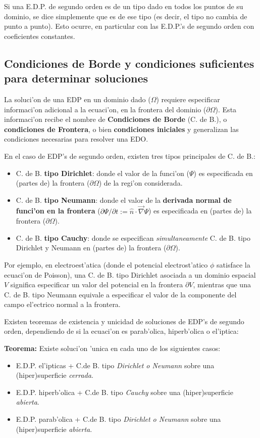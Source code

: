 Si una E.D.P. de segundo orden es de un tipo dado en todos los puntos de su dominio, se dice simplemente que es de ese tipo (es decir, el tipo no cambia de punto a punto). Esto ocurre, en particular con las E.D.P.'s de segundo orden con coeficientes constantes.

\subsection{Condiciones de Borde y condiciones suficientes para determinar soluciones}
La soluci'on de una EDP en un dominio dado ($\Omega$) requiere especificar informaci'on adicional a la ecuaci'on, en la frontera del dominio ($\partial\Omega$). Esta informaci'on recibe el nombre de \textbf{Condiciones de Borde} (C. de B.), o \textbf{condiciones de Frontera}, o bien \textbf{condiciones iniciales} y generalizan las condiciones necesarias para resolver una EDO.

En el caso de EDP's de segundo orden, existen tres tipos principales de C. de B.:

\begin{itemize}
\item C. de B. \textbf{tipo Dirichlet}: donde el valor de la funci'on ($\Psi$) es especificada en (partes de) la frontera ($\partial\Omega$) de la regi'on considerada.
\item C. de B. \textbf{tipo Neumann}: donde el valor de la \textbf{derivada normal de funci'on en la frontera} ($\partial\Psi/\partial t:=\hat{n}\cdot\vec\nabla\Psi$) es especificada en (partes de) la frontera ($\partial\Omega$).
\item C. de B. \textbf{tipo Cauchy}: donde se especifican \textit{simultaneamente} C. de B. tipo Dirichlet y Neumann en (partes de) la frontera ($\partial\Omega$).
\end{itemize}

Por ejemplo, en electroest'atica (donde el potencial electrost'atico $\phi$ satisface la ecuaci'on de Poisson), una C. de B. tipo Dirichlet asociada a un dominio espacial $V$ significa especificar un valor del potencial en la frontera $\partial V$, mientras que una C. de B. tipo Neumann equivale a especificar el valor de la componente del campo el'ectrico normal a la frontera. 

Existen teoremas de existencia y unicidad de soluciones de EDP's de segundo orden, dependiendo de si la ecuaci'on es parab'olica, hiperb'olica o el'iptica:

\begin{tcolorbox}
\textbf{Teorema:} Existe soluci'on 'unica en cada uno de los siguientes casos:

\begin{itemize}
\item E.D.P. el'ipticas +  C.de B. tipo \textit{Dirichlet o Neumann} sobre una (hiper)superficie \textit{cerrada}.
\item E.D.P. hiperb'olica + C.de B. tipo \textit{Cauchy} sobre una (hiper)superficie \textit{abierta}.
\item E.D.P. parab'olica + C.de B. tipo \textit{Dirichlet o Neumann} sobre una (hiper)superficie \textit{abierta}.
\end{itemize}
\end{tcolorbox}
